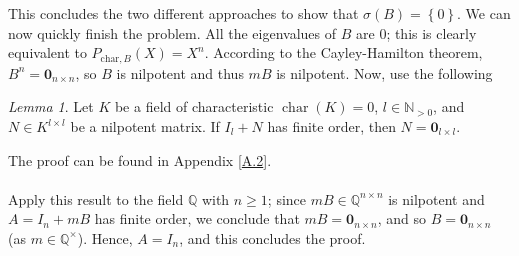 \documentclass[11pt, a4paper, oneside]{article}
\theoremstyle{remark}
\theoremstyle{lemma}
\newtheorem*{lemma}{Lemma}
\begin{document}
\\\\
This concludes the two different approaches to show that \( \sigma\left( B \right) = \left\{ 0 \right\} \). We can now quickly finish the problem. All the eigenvalues of \( B \) are \( 0 \); this is clearly equivalent to \( P_{\text{char},B}\left( X \right) = X^n \). According to the Cayley-Hamilton theorem, \( B^n = \mathbf{0}_{n\times n} \), so \( B \) is nilpotent and thus \( mB \) is nilpotent. Now, use the following
\begin{lemma}
Let $K$ be a field of characteristic $\operatorname{char}(K) = 0$, \( l \in \mathbb{N}_{>0} \), and \( N \in K^{l \times l} \) be a nilpotent matrix. If \( I_{l} + N \) has finite order, then \( N = \mathbf{0}_{l \times l} \).
\end{lemma}
The proof can be found in Appendix [\hyperref[A2]{A.2}].
\\\\
Apply this result to the field $\mathbb{Q}$ with \( n \geq 1 \); since \( mB \in \mathbb{Q}^{n \times n} \) is nilpotent and \( A = I_n + mB \) has finite order, we conclude that \( mB = \mathbf{0}_{n \times n} \), and so \( B = \mathbf{0}_{n \times n} \) (as \( m \in \mathbb{Q}^{\times} \)). Hence, \( A = I_n \), and this concludes the proof.
\end{document}
